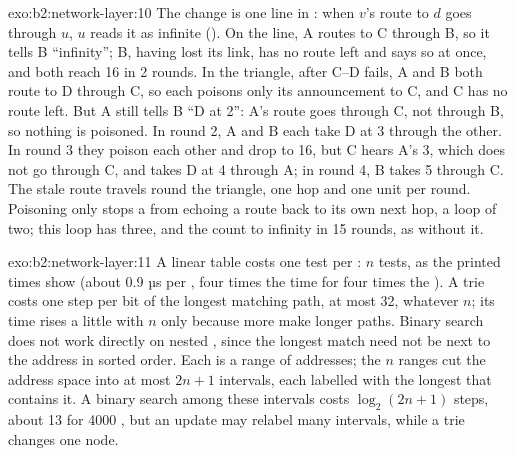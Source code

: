 \begin{solution}{exo:b2:network-layer:10}
The change is one line in : when $v$'s route to $d$ goes through $u$, $u$ reads it as infinite
(). On the line, A routes to C through B, so it tells B ``infinity''; B, having lost its link, has
no route left and says so at once, and both reach 16 in 2 rounds. In the triangle, after C--D fails, A and B both
route to D through C, so each poisons only its announcement to C, and C has no route left. But A still tells B ``D
at 2'': A's route goes through C, not through B, so nothing is poisoned. In round 2, A and B each take D at 3 through
the other. In round 3 they poison each other and drop to 16, but C hears A's 3, which does not go through C, and
takes D at 4 through A; in round 4, B takes 5 through C. The stale route travels round the triangle, one hop and one
unit per round. Poisoning only stops a  from echoing a route back to its own next hop, a loop of two; this loop
has three, and the  count to infinity in 15 rounds, as without it.
\end{solution}

\begin{solution}{exo:b2:network-layer:11}
A linear table costs one test per : $n$ tests, as the printed times show (about 0.9 µs per , four times
the time for four times the ). A trie costs one step per bit of the longest matching path, at most 32,
whatever $n$; its time rises a little with $n$ only because more  make longer paths. Binary search does not
work directly on nested , since the longest match need not be next to the address in sorted order. Each
 is a range of addresses; the $n$ ranges cut the address space into at most $2n + 1$ intervals, each labelled
with the longest  that contains it. A binary search among these intervals costs $\log_2(2n + 1)$ steps, about
13 for 4000 , but an update may relabel many intervals, while a trie changes one node.
\end{solution}

